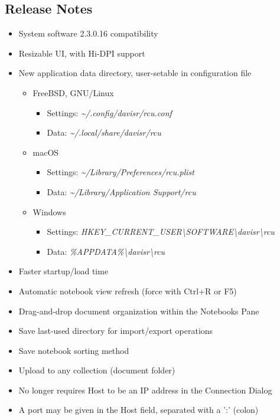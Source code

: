 \documentclass{memoir}
\begin{document}
{{\subsection{Release Notes}
\begin{itemize}
\item{System software 2.3.0.16 compatibility}
\item{Resizable UI, with Hi-DPI support}
\item{New application data directory, user-setable in configuration file}
  \begin{itemize}
  \item{FreeBSD, GNU/Linux}
    \begin{itemize}
    \item[]{Settings: \textit{\textasciitilde/.config/davisr/rcu.conf}}
    \item[]{Data: \textit{\textasciitilde/.local/share/davisr/rcu}}
    \end{itemize}
  \item{macOS}
    \begin{itemize}
    \item[]{Settings: \textit{\textasciitilde/Library/Preferences/rcu.plist}}
    \item[]{Data: \textit{\textasciitilde/Library/Application Support/rcu}}
    \end{itemize}
  \item{Windows}
    \begin{itemize}
    \item[]{Settings: \textit{HKEY\_CURRENT\_USER\textbackslash SOFTWARE\textbackslash davisr\textbackslash rcu}}
    \item[]{Data: \textit{\%APPDATA\%\textbackslash davisr\textbackslash rcu}}
    \end{itemize}
  \end{itemize}
\item{Faster startup/load time}
\item{Automatic notebook view refresh (force with Ctrl+R or F5)}
\item{Drag-and-drop document organization within the Notebooks Pane}
\item{Save last-used directory for import/export operations}
\item{Save notebook sorting method}
\item{Upload to any collection (document folder)}
\item{No longer requires Host to be an IP address in the Connection Dialog}
\item{A port may be given in the Host field, separated with a ':' (colon)}

\end{itemize}}}
\end{document}
